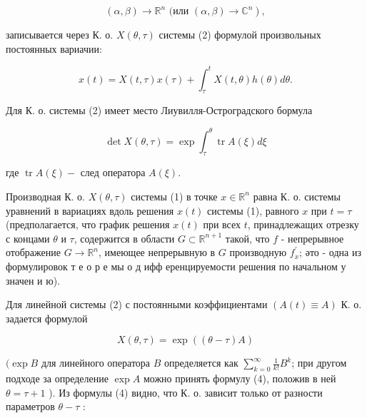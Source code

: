 \documentclass[10pt]{article}
\begin{document}
\[

\left.(\alpha, \beta) \longrightarrow \mathbb{R}^{n} \text { (или }(\alpha, \beta) \longrightarrow \mathbb{C}^{n}\right),

\]



записывается через К. о. $X(\theta, \tau)$ системы (2) формулой произвольных постоянных вариачии:



\[

x(t)=X(t, \tau) x(\tau)+\int_{\tau}^{t} X(t, \theta) h(\theta) d \theta .

\]



Для К. о. системы (2) имеет место Лиувилля-Остроградского бормула



\[

\operatorname{det} X(\theta, \tau)=\exp \int_{\tau}^{\theta} \operatorname{tr} A(\xi) d \xi

\]



где $\operatorname{tr} A(\xi)-$ след оператора $A(\xi)$.



Производная К. о. $X(\theta, \tau)$ системы (1) в точке $x \in \mathbb{R}^{n}$ равна К. о. системы уравнений в вариациях вдоль решения $x(t)$ системы (1), равного $x$ при $t=\tau$ (предполагается, что график решения $x(t)$ при всех $t$, принадлежащих отрезку с концами $\theta$ и $\tau$, содержится в области $G \subset \mathbb{R}^{n+1}$ такой, что $f$ - непрерывное отображение $G \rightarrow \mathbb{R}^{n}$, имеющее непрерывную в $G$ производную $f_{x}^{\prime}$; әто - одна из формулировок т е о р е мы о д ифф еренцируемости решения по начальном у значен и ю).



Для линейной системы (2) с постоянными коэффициентами $(A(t) \equiv A)$ К. о. задается формулой



\[

X(\theta, \tau)=\exp ((\theta-\tau) A)

\]



$(\exp B$ для линейного оператора $B$ определяется как $\sum_{k=0}^{\infty} \frac{1}{k !} B^{k}$; при другом подходе за определение $\exp A$ можно принять формулу (4), положив в ней $\theta=\tau+1$ ). Из формулы (4) видно, что К. о. зависит только от разности параметров $\theta-\tau$ :
\end{document}
